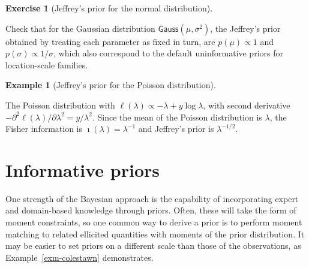 \documentclass[
  11pt,
  letterpaper,
]{scrbook}
\theoremstyle{definition}
\newtheorem{exercise}{Exercise}[chapter]
\theoremstyle{definition}
\newtheorem{example}{Example}[chapter]
\theoremstyle{definition}
\theoremstyle{plain}
\theoremstyle{plain}
\theoremstyle{remark}
\begin{document}
\begin{exercise}[Jeffrey's prior for the normal
distribution]\protect\hypertarget{exr-jeffreysnormal}{}\label{exr-jeffreysnormal}

Check that for the Gaussian distribution
\(\mathsf{Gauss}(\mu, \sigma^2)\), the Jeffrey's prior obtained by
treating each parameter as fixed in turn, are \(p(\mu) \propto 1\) and
\(p(\sigma) \propto 1/\sigma\), which also correspond to the default
uninformative priors for location-scale families.

\end{exercise}

\begin{example}[Jeffrey's prior for the Poisson
distribution]\protect\hypertarget{exm-jeffreyspoisson}{}\label{exm-jeffreyspoisson}

The Poisson distribution with
\(\ell(\lambda) \propto -\lambda + y\log \lambda\), with second
derivative
\(-\partial^2 \ell(\lambda)/\partial \lambda^2 = y/\lambda^2\). Since
the mean of the Poisson distribution is \(\lambda\), the Fisher
information is \(\imath(\lambda) = \lambda^{-1}\) and Jeffrey's prior is
\(\lambda^{-1/2}\).

\end{example}

\section{Informative priors}\label{informative-priors}

One strength of the Bayesian approach is the capability of incorporating
expert and domain-based knowledge through priors. Often, these will take
the form of moment constraints, so one common way to derive a prior is
to perform moment matching to related ellicited quantities with moments
of the prior distribution. It may be easier to set priors on a different
scale than those of the observations, as Example~\ref{exm-colestawn}
demonstrates.
\end{document}
